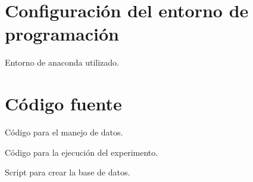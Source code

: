 \documentclass[\main/main.tex]{subfiles}
\begin{document}
\chapter{Configuración del entorno de programación}
\label{cha:a01_instalacion}
	Entorno de anaconda utilizado.

\chapter{Código fuente}
\label{cha:a02_código_fuente}
	Código para el manejo de datos.

	\newpage
	Código para la ejecución del experimento. 

	\newpage
	Script para crear la base de datos.
\end{document}
